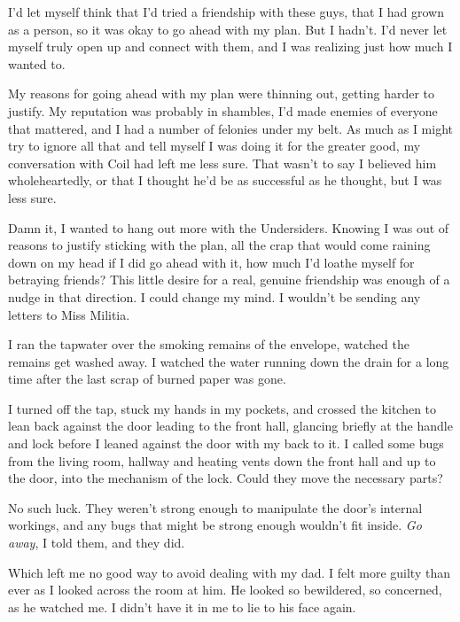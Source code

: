 I'd let myself think that I'd tried a friendship with these guys, that I had grown as a person, so it was okay to go ahead with my plan.  But I hadn't.  I'd never let myself truly open up and connect with them, and I was realizing just how much I wanted to.



My reasons for going ahead with my plan were thinning out, getting harder to justify.  My reputation was probably in shambles, I'd made enemies of everyone that mattered, and I had a number of felonies under my belt.  As much as I might try to ignore all that and tell myself I was doing it for the greater good, my conversation with Coil had left me less sure.  That wasn't to say I believed him wholeheartedly, or that I thought he'd be as successful as he thought, but I was less sure.



Damn it, I wanted to hang out more with the Undersiders. Knowing I was out of reasons to justify sticking with the plan, all the crap that would come raining down on my head if I did go ahead with it, how much I'd loathe myself for betraying friends?  This little desire for a real, genuine friendship was enough of a nudge in that direction.  I could change my mind.  I wouldn't be sending any letters to Miss Militia.



I ran the tapwater over the smoking remains of the envelope, watched the remains get washed away.  I watched the water running down the drain for a long time after the last scrap of burned paper was gone.



I turned off the tap, stuck my hands in my pockets, and crossed the kitchen to lean back against the door leading to the front hall, glancing briefly at the handle and lock before I leaned against the door with my back to it.  I called some bugs from the living room, hallway and heating vents down the front hall and up to the door, into the mechanism of the lock.  Could they move the necessary parts?



No such luck.  They weren't strong enough to manipulate the door's internal workings, and any bugs that might be strong enough wouldn't fit inside.  \emph{Go away}, I told them, and they did.



Which left me no good way to avoid dealing with my dad.  I felt more guilty than ever as I looked across the room at him.  He looked so bewildered, so concerned, as he watched me.  I didn't have it in me to lie to his face again.



